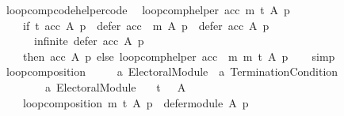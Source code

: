 \begin{isabellebody}
%
\endisadelimproof
\isanewline
{}\isamarkupfalse%
\ loop{\isacharunderscore}{\kern0pt}comp{\isacharunderscore}{\kern0pt}code{\isacharunderscore}{\kern0pt}helper{\isacharbrackleft}{\kern0pt}code{\isacharbrackright}{\kern0pt}{\isacharcolon}{\kern0pt}\isanewline
\ \ {\isachardoublequoteopen}loop{\isacharunderscore}{\kern0pt}comp{\isacharunderscore}{\kern0pt}helper\ acc\ m\ t\ A\ p\ {\isacharequal}{\kern0pt}\isanewline
\ \ \ \ {\isacharparenleft}{\kern0pt}if\ {\isacharparenleft}{\kern0pt}t\ {\isacharparenleft}{\kern0pt}acc\ A\ p{\isacharparenright}{\kern0pt}\ {\isasymor}\ {\isasymnot}{\isacharparenleft}{\kern0pt}{\isacharparenleft}{\kern0pt}defer\ {\isacharparenleft}{\kern0pt}acc\ {\isasymtriangleright}\ m{\isacharparenright}{\kern0pt}\ A\ p{\isacharparenright}{\kern0pt}\ {\isasymsubset}\ {\isacharparenleft}{\kern0pt}defer\ acc\ A\ p{\isacharparenright}{\kern0pt}{\isacharparenright}{\kern0pt}\ {\isasymor}\isanewline
\ \ \ \ \ \ infinite\ {\isacharparenleft}{\kern0pt}defer\ acc\ A\ p{\isacharparenright}{\kern0pt}{\isacharparenright}{\kern0pt}\isanewline
\ \ \ \ then\ {\isacharparenleft}{\kern0pt}acc\ A\ p{\isacharparenright}{\kern0pt}\ else\ {\isacharparenleft}{\kern0pt}loop{\isacharunderscore}{\kern0pt}comp{\isacharunderscore}{\kern0pt}helper\ {\isacharparenleft}{\kern0pt}acc\ {\isasymtriangleright}\ m{\isacharparenright}{\kern0pt}\ m\ t\ A\ p{\isacharparenright}{\kern0pt}{\isacharparenright}{\kern0pt}{\isachardoublequoteclose}\isanewline
%
\isadelimproof
\ \ %
\endisadelimproof
%
\isatagproof
{}\isamarkupfalse%
\ simp%
\endisatagproof
{\isafoldproof}%
%
\isadelimproof
\isanewline
%
\endisadelimproof
\isanewline
{}\isamarkupfalse%
\ loop{\isacharunderscore}{\kern0pt}composition\ {\isacharcolon}{\kern0pt}{\isacharcolon}{\kern0pt}\isanewline
\ \ \ \ {\isachardoublequoteopen}{\isacharprime}{\kern0pt}a\ Electoral{\isacharunderscore}{\kern0pt}Module\ {\isasymRightarrow}\ {\isacharprime}{\kern0pt}a\ Termination{\isacharunderscore}{\kern0pt}Condition\ {\isasymRightarrow}\isanewline
\ \ \ \ \ \ \ \ {\isacharprime}{\kern0pt}a\ Electoral{\isacharunderscore}{\kern0pt}Module{\isachardoublequoteclose}\ \isanewline
\ \ {\isachardoublequoteopen}t\ {\isacharparenleft}{\kern0pt}{\isacharbraceleft}{\kern0pt}{\isacharbraceright}{\kern0pt}{\isacharcomma}{\kern0pt}\ {\isacharbraceleft}{\kern0pt}{\isacharbraceright}{\kern0pt}{\isacharcomma}{\kern0pt}\ A{\isacharparenright}{\kern0pt}\ {\isasymLongrightarrow}\isanewline
\ \ \ \ loop{\isacharunderscore}{\kern0pt}composition\ m\ t\ A\ p\ {\isacharequal}{\kern0pt}\ defer{\isacharunderscore}{\kern0pt}module\ A\ p{\isachardoublequoteclose}\ {\isacharbar}{\kern0pt}\isanewline

\end{isabellebody}
